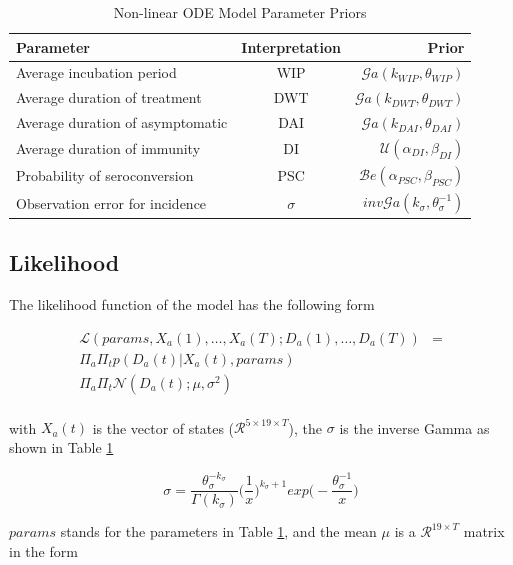 \documentclass[12pt]{article}
\begin{document}
\begin{table}[h!]
\centering
 \begin{tabular}{||l c r||} 
 \hline
 Parameter & Interpretation & Prior \\ [0.5ex] 
 \hline\hline
 Average incubation period & WIP & $\mathcal{G}a(k_{WIP}, \theta_{WIP})$  \\
 Average duration of treatment & DWT & $\mathcal{G}a(k_{DWT}, \theta_{DWT})$  \\
 Average duration of asymptomatic & DAI & $\mathcal{G}a(k_{DAI}, \theta_{DAI})$  \\
 Average duration of immunity & DI & $\mathcal{U}(\alpha_{DI}, \beta_{DI})$ \\
 Probability of seroconversion & PSC & $\mathcal{B}e(\alpha_{PSC}, \beta_{PSC})$ \\
 Observation error for incidence & $\sigma$ & $inv\mathcal{G}a(k_{\sigma}, \theta_{\sigma}^{-1})$ \\[1ex] 
 \hline
 \end{tabular}
 \caption{Non-linear ODE Model Parameter Priors}
\label{table:priors}
\end{table} 

\subsection{Likelihood}

The likelihood function of the model has the following form 

\begin{align}
\label{eq:likelihood}
\mathcal{L}(params, X_{a}(1), \dots, X_{a}(T); D_{a}(1), \dots, D_{a}(T)) &= \\ \nonumber
\Pi_{a}\Pi_{t}p(D_{a}(t) | X_{a}(t), params) & \\\nonumber
\Pi_{a}\Pi_{t}\mathcal{N}(D_{a}(t); \mu, \sigma^2) & \\\nonumber
\end{align}

with $X_{a}(t)$ is the vector of states ($\mathcal{R}^{5 \times 19 \times T}$), the $\sigma$ is the inverse Gamma as shown in Table \ref{table:priors}

\begin{equation}
\sigma = \frac{\theta_{\sigma}^{-k_{\sigma}}}{\Gamma(k_{\sigma})}\bigg(\frac{1}{x} \bigg)^{k_{\sigma} + 1} exp\bigg(-\frac{\theta_{\sigma}^{-1}}{x} \bigg)
\end{equation}

$params$ stands for the parameters in Table \ref{table:priors}, and the mean $\mu$ is a $\mathcal{R}^{19 \times T}$ matrix in the form
\end{document}
